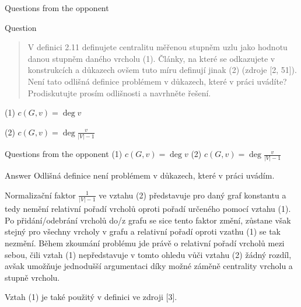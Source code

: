 \begin{frame}{Questions from the opponent}
\begin{alertblock}{Question}
    \begin{quote}
        V definici 2.11 definujete centralitu měřenou stupněm uzlu jako hodnotu danou stupněm daného vrcholu (1).
        Články, na které se odkazujete v konstrukcích a důkazech ovšem tuto míru definují jinak (2) (zdroje [2, 51]).
        Není tato odlišná definice problémem v důkazech, které v práci uvádíte?
        Prodiskutujte prosím odlišnosti a navrhněte řešení.
    \end{quote}
\end{alertblock}

\centering
(1) $c(G,v) = \deg v$

\centering
(2) $c(G,v) = \deg \frac{v}{|V|-1}$
\end{frame}


\begin{frame}{Questions from the opponent}
    \centering
    (1) $c(G,v) = \deg v$
    \medspace\medspace\medspace\medspace\medspace\medspace\medspace\medspace\medspace
    (2) $c(G,v) = \deg \frac{v}{|V|-1}$

    \begin{exampleblock}{Answer}
        Odlišná definice není problémem v důkazech, které v práci uvádím.

        Normalizační faktor $\frac{1}{|V|-1}$ ve vztahu (2) představuje pro daný graf konstantu
        a tedy nemění relativní pořadí vrcholů oproti pořadí určeného pomocí vztahu (1).
        Po přidání/odebrání vrcholů do/z grafu se sice tento faktor změní, zůstane však stejný pro všechny vrcholy v grafu
        a relativní pořadí oproti vzathu (1) se tak nezmění.
        Během zkoumání problému \HL jde právě o relativní pořadí vrcholů mezi sebou,
        čili vztah (1) nepředstavuje v tomto ohledu vůči vztahu (2) žádný rozdíl,
        avšak umožňuje jednodušší argumentaci díky možné záměně centrality vrcholu a stupně vrcholu.

        Vztah (1) je také použitý v definici ve zdroji [3].


    \end{exampleblock}

\end{frame}